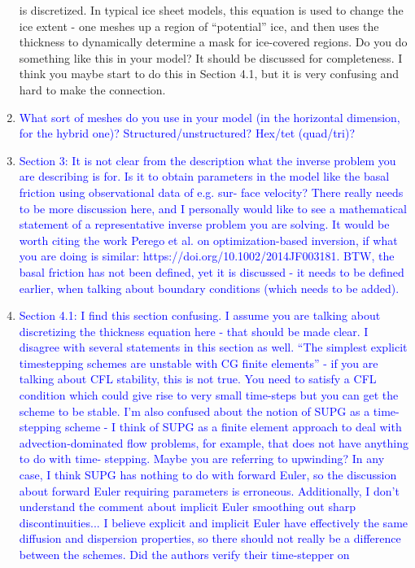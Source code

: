 \documentclass{article}
\theoremstyle{definition}
\theoremstyle{plain}
\begin{document}
\begin{enumerate}
{is discretized. In typical ice sheet models, this equation is used to change the ice extent - one
meshes up a region of “potential” ice, and then uses the thickness to dynamically determine a mask
for ice-covered regions. Do you do something like this in your model? It should be discussed for
completeness. I think you maybe start to do this in Section 4.1, but it is very confusing and hard to
make the connection.}
\item \textcolor{blue}{What sort of meshes do you use in your model (in the horizontal dimension, for the hybrid one)?
Structured/unstructured? Hex/tet (quad/tri)?}
\item \textcolor{blue}{Section 3: It is not clear from the description what the inverse problem you are describing is for.
Is it to obtain parameters in the model like the basal friction using observational data of e.g. sur-
face velocity? There really needs to be more discussion here, and I personally would like to see
a mathematical statement of a representative inverse problem you are solving. It would be worth
citing the work Perego et al. on optimization-based inversion, if what you are doing is similar:
https://doi.org/10.1002/2014JF003181. BTW, the basal friction has not been defined, yet it is
discussed - it needs to be defined earlier, when talking about boundary conditions (which needs to
be added).}
\item \textcolor{blue}{Section 4.1: I find this section confusing. I assume you are talking about discretizing the thickness
equation here - that should be made clear. I disagree with several statements in this section as
well. “The simplest explicit timestepping schemes are unstable with CG finite elements” - if you are
talking about CFL stability, this is not true. You need to satisfy a CFL condition which could give
rise to very small time-steps but you can get the scheme to be stable. I’m also confused about the
notion of SUPG as a time-stepping scheme - I think of SUPG as a finite element approach to deal
with advection-dominated flow problems, for example, that does not have anything to do with time-
stepping. Maybe you are referring to upwinding? In any case, I think SUPG has nothing to do with
forward Euler, so the discussion about forward Euler requiring parameters is erroneous. Additionally,
I don’t understand the comment about implicit Euler smoothing out sharp discontinuities... I believe
explicit and implicit Euler have effectively the same diffusion and dispersion properties, so there
should not really be a difference between the schemes. Did the authors verify their time-stepper on
}
\end{enumerate}
\end{document}
